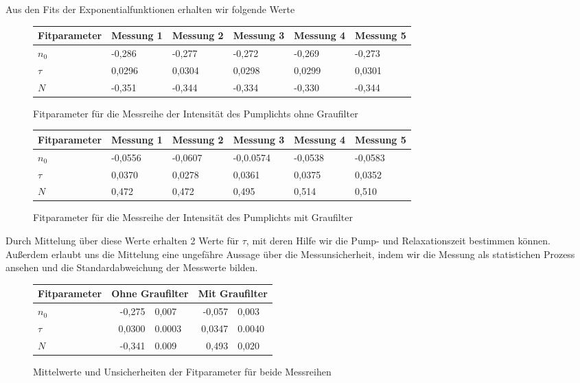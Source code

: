\documentclass[bigchapter,colorback,accentcolor=tud4b,linedtoc,11pt]{tudreport}
\begin{document}
Aus den Fits der Exponentialfunktionen erhalten wir folgende Werte
\begin{figure}[h]
  \centering
  \begin{tabular}{l|lllll}
    Fitparameter & Messung 1 & Messung 2 & Messung 3 & Messung 4 & Messung 5 \\ \hline
    $n_0$        & -0,286    & -0,277    & -0,272    & -0,269    & -0,273    \\
    $\tau$       & 0,0296    & 0,0304    & 0,0298    & 0,0299    & 0,0301    \\
    $N$          & -0,351    & -0,344    & -0,334    & -0,330    & -0,344    \\
  \end{tabular}
  \caption{Fitparameter für die Messreihe der Intensität des Pumplichts ohne Graufilter}
\end{figure}

\begin{figure}[h]
  \centering
  \begin{tabular}{l|lllll}
    Fitparameter & Messung 1 & Messung 2 & Messung 3 & Messung 4 & Messung 5 \\ \hline
    $n_0$        & -0,0556   & -0,0607   & -0,0.0574 & -0,0538   & -0,0583   \\
    $\tau$       & 0,0370    & 0,0278    & 0,0361    & 0,0375    & 0,0352    \\
    $N$          & 0,472     & 0,472     & 0,495     & 0,514     & 0,510     \\
  \end{tabular}
  \caption{Fitparameter für die Messreihe der Intensität des Pumplichts mit Graufilter}
\end{figure}

Durch Mittelung über diese Werte erhalten 2 Werte für $\tau$, mit deren Hilfe
wir die Pump- und Relaxationszeit bestimmen können. Außerdem erlaubt uns die
Mittelung eine ungefähre Aussage über die Messunsicherheit, indem wir die
Messung als statistichen Prozess ansehen und die Standardabweichung der
Messwerte bilden.

\begin{figure}[h]
  \centering
  \begin{tabular}{l|r@{$\pm$}l r@{$\pm$}l}
        Fitparameter & \multicolumn{2}{c}{Ohne Graufilter} & \multicolumn{2}{c}{Mit Graufilter} \\ \hline
    $n_0$        & -0,275                           & 0,007  & -0,057 & 0,003         \\
    $\tau$       & 0,0300                           & 0.0003 & 0,0347 & 0.0040        \\
    $N$          & -0,341                           & 0.009  & 0,493  & 0,020         \\
  \end{tabular}
  \caption{Mittelwerte und Unsicherheiten der Fitparameter für beide Messreihen}
\end{figure}
\end{document}
